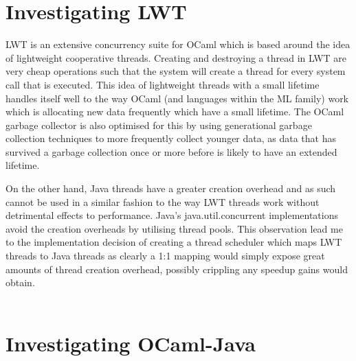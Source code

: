 \documentclass[12pt,twoside,notitlepage]{report}
\begin{document}
\section{Investigating LWT}
\label{sec:investigating_lwt}
%
%
LWT is an extensive concurrency suite for OCaml which is based around the idea of lightweight cooperative threads\cite{dimino2012}. Creating and destroying a thread in LWT are very cheap operations such that the system will create a
thread for every system call that is executed. This idea of lightweight threads with a small lifetime handles itself well to the way OCaml (and languages within the ML family) work which is allocating new data frequently which have a
small lifetime. The OCaml garbage collector is also optimised for this by using generational garbage collection techniques to more frequently collect younger data, as data that has survived a garbage collection once or more before is
likely to have an extended lifetime.\cite{chailloux2000}

On the other hand, Java threads have a greater creation overhead and as such cannot be used in a similar fashion to the way LWT threads work without detrimental effects to performance. Java's java.util.concurrent implementations avoid
the creation overheads by utilising thread pools\cite{web:threadpools}. This observation lead me to the implementation decision of creating a thread scheduler which maps LWT threads to Java threads as clearly a 1:1 mapping would
simply expose great amounts of thread creation overhead, possibly crippling any speedup gains would obtain.
\\
\\
%
%



\section{Investigating OCaml-Java}
\label{sec:investigating_ocaml-java}
%
%

%
%
\end{document}
